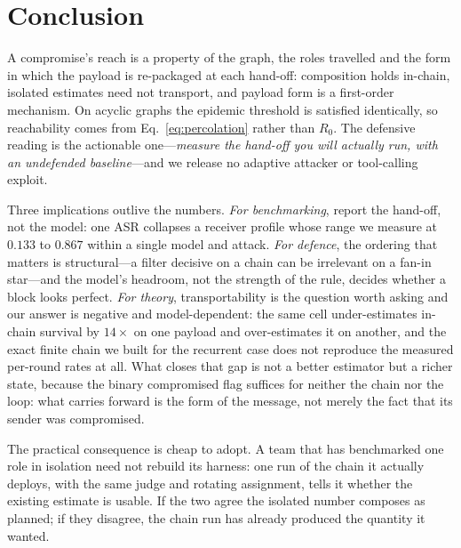 \documentclass[sigconf,anonymous]{aamas}
\begin{document}
\section{Conclusion}
\label{sec:conclusion}

A compromise's reach is a property of the graph, the roles travelled and the form in
which the payload is re-packaged at each hand-off: composition holds in-chain, isolated
estimates need not transport, and payload form is a first-order mechanism. On acyclic
graphs the epidemic threshold is satisfied identically, so reachability comes from
Eq.~\eqref{eq:percolation} rather than $R_0$. The defensive reading is the actionable
one---\emph{measure the hand-off you will actually run, with an undefended
baseline}---and we release no adaptive attacker or tool-calling exploit.

Three implications outlive the numbers. \emph{For benchmarking}, report the hand-off, not
the model: one ASR collapses a receiver profile whose range we measure at $0.133$ to
$0.867$ within a single model and attack. \emph{For defence}, the ordering that matters is
structural---a filter decisive on a chain can be irrelevant on a fan-in star---and the
model's headroom, not the strength of the rule, decides whether a block looks perfect.
\emph{For theory}, transportability is the question worth asking and our answer is
negative and model-dependent: the same cell under-estimates in-chain survival by
$14\times$ on one payload and over-estimates it on another, and the exact finite chain we
built for the recurrent case does not reproduce the measured per-round rates at all. What
closes that gap is not a better estimator but a richer state, because the binary
compromised flag suffices for neither the chain nor the loop: what carries forward is the
form of the message, not merely the fact that its sender was compromised.

The practical consequence is cheap to adopt. A team that has benchmarked one role in
isolation need not rebuild its harness: one run of the chain it actually deploys, with the
same judge and rotating assignment, tells it whether the existing estimate is usable. If
the two agree the isolated number composes as planned; if they disagree, the chain run has
already produced the quantity it wanted.



\end{document}

